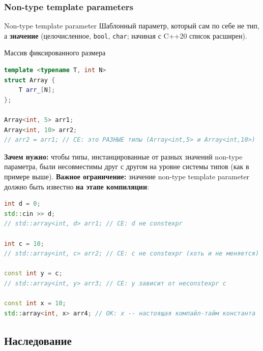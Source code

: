 \subsubsection{Non-type template parameters}
\begin{definition}{Non-type template parameter}{}
Шаблонный параметр, который сам по себе не тип, а \textbf{значение} (целочисленное, \texttt{bool}, \texttt{char}; начиная с C++20 список расширен).
\end{definition}
\begin{implementation}{Массив фиксированного размера}{}
\begin{lstlisting}[language=C++]
template <typename T, int N>
struct Array {
    T arr_[N];
};

Array<int, 5> arr1;
Array<int, 10> arr2;
// arr2 = arr1; // CE: это РАЗНЫЕ типы (Array<int,5> и Array<int,10>)
\end{lstlisting}
\end{implementation}
\textbf{Зачем нужно:} чтобы типы, инстанцированные от разных значений non-type параметра, были несовместимы друг с другом на уровне системы типов (как в примере выше).
\textbf{Важное ограничение:} значение non-type template parameter должно быть известно \textbf{на этапе компиляции}:
\begin{lstlisting}[language=C++]
int d = 0;
std::cin >> d;
// std::array<int, d> arr1; // CE: d не constexpr

int c = 10;
// std::array<int, c> arr2; // CE: c не constexpr (хоть и не меняется)

const int y = c;
// std::array<int, y> arr3; // CE: y зависит от неconstexpr c

const int x = 10;
std::array<int, x> arr4; // OK: x -- настоящая компайл-тайм константа
\end{lstlisting}

\subsection{Наследование}
